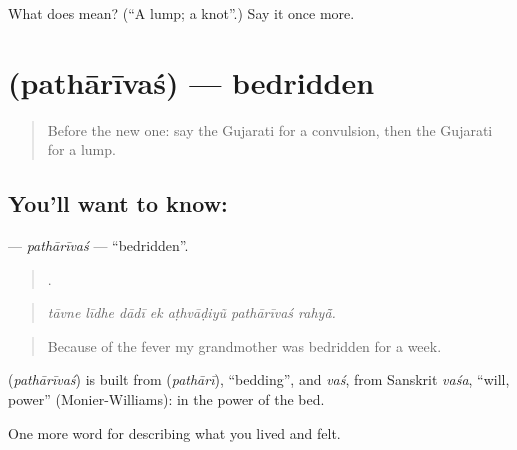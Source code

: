 \begin{tcolorbox}[breakable,colback=teal!4,colframe=teal!35!black,title={Before you move on}]
What does  mean? (\textquotedblleft{}A lump; a knot\textquotedblright{}.) Say it once more.
\end{tcolorbox}
\section[\texorpdfstring{\gu{પથારીવશ} (pathārīvaś)}{પથારીવશ (pathārīvaś)}]{ (pathārīvaś) — bedridden}

\label{lesson:GU-C479-patharivas}



\begin{quote}
Before the new one: say the Gujarati for a convulsion, then the Gujarati for a lump.
\end{quote}

\subsection*{You'll want to know: }
\textbf{} — \emph{pathārīvaś} — \textquotedblleft{}bedridden\textquotedblright{}.

\begin{quote}
      .
\end{quote}

\begin{quote}
\emph{tāvne līdhe dādī ek aṭhvāḍiyũ pathārīvaś rahyā̃.}
\end{quote}

\begin{quote}
Because of the fever my grandmother was bedridden for a week.
\end{quote}

\begin{cousinweb}
\textbf{} (\emph{pathārīvaś}) is built from \textbf{} (\emph{pathārī}), \textquotedblleft{}bedding\textquotedblright{}, and \emph{vaś}, from Sanskrit \emph{vaśa}, \textquotedblleft{}will, power\textquotedblright{} (Monier-Williams): in the power of the bed.
\end{cousinweb}

\begin{grammarlens}[title={What you've built}]
One more word for describing what you lived and felt.
\end{grammarlens}

